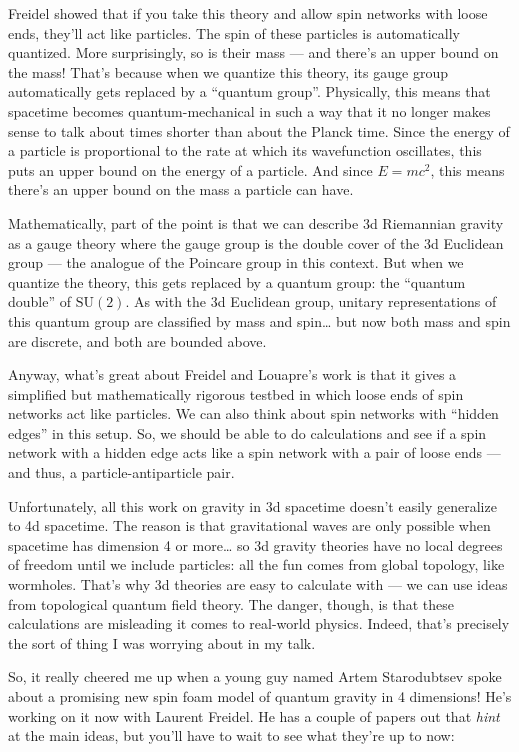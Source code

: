 \documentclass{article}
\begin{document}
Freidel showed that if you take this theory and allow spin networks with
loose ends, they'll act like particles. The spin of these particles is
automatically quantized. More surprisingly, so is their mass --- and
there's an upper bound on the mass! That's because when we quantize this
theory, its gauge group automatically gets replaced by a ``quantum
group''. Physically, this means that spacetime becomes
quantum-mechanical in such a way that it no longer makes sense to talk
about times shorter than about the Planck time. Since the energy of a
particle is proportional to the rate at which its wavefunction
oscillates, this puts an upper bound on the energy of a particle. And
since \(E = mc^2\), this means there's an upper bound on the mass a
particle can have.

Mathematically, part of the point is that we can describe 3d Riemannian
gravity as a gauge theory where the gauge group is the double cover of
the 3d Euclidean group --- the analogue of the Poincare group in this
context. But when we quantize the theory, this gets replaced by a
quantum group: the ``quantum double'' of \(\mathrm{SU}(2)\). As with the
3d Euclidean group, unitary representations of this quantum group are
classified by mass and spin\ldots{} but now both mass and spin are
discrete, and both are bounded above.

Anyway, what's great about Freidel and Louapre's work is that it gives a
simplified but mathematically rigorous testbed in which loose ends of
spin networks act like particles. We can also think about spin networks
with ``hidden edges'' in this setup. So, we should be able to do
calculations and see if a spin network with a hidden edge acts like a
spin network with a pair of loose ends --- and thus, a
particle-antiparticle pair.

Unfortunately, all this work on gravity in 3d spacetime doesn't easily
generalize to 4d spacetime. The reason is that gravitational waves are
only possible when spacetime has dimension 4 or more\ldots{} so 3d
gravity theories have no local degrees of freedom until we include
particles: all the fun comes from global topology, like wormholes.
That's why 3d theories are easy to calculate with --- we can use ideas
from topological quantum field theory. The danger, though, is that these
calculations are misleading it comes to real-world physics. Indeed,
that's precisely the sort of thing I was worrying about in my talk.

So, it really cheered me up when a young guy named Artem Starodubtsev
spoke about a promising new spin foam model of quantum gravity in 4
dimensions! He's working on it now with Laurent Freidel. He has a couple
of papers out that \emph{hint} at the main ideas, but you'll have to
wait to see what they're up to now:
\end{document}
